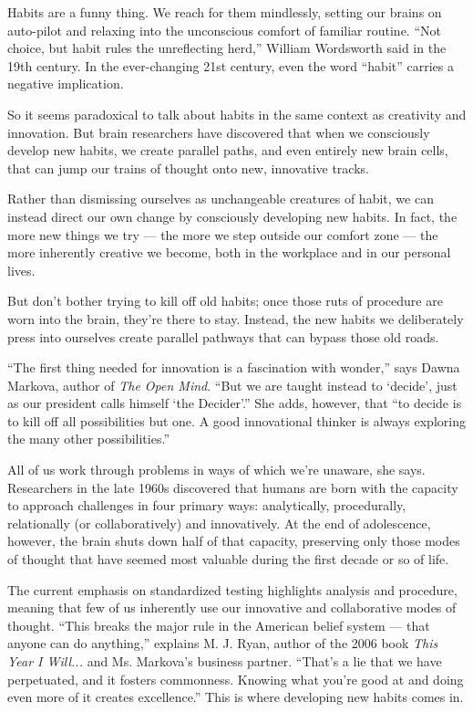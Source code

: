 \documentclass[UTF8,11pt]{ctexart}
\begin{document}
Habits are a funny thing. We reach for them mindlessly, setting our brains on auto-pilot and relaxing into the unconscious comfort of familiar routine. “Not choice, but habit rules the unreflecting herd,” William Wordsworth said in the 19th century. In the ever-changing 21st century, even the word “habit” carries a negative implication.


So it seems paradoxical to talk about habits in the same context as creativity and innovation. But brain researchers have discovered that when we consciously develop new habits, we create parallel paths, and even entirely new brain cells, that can jump our trains of thought onto new, innovative tracks.


Rather than dismissing ourselves as unchangeable creatures of habit, we can instead direct our own change by consciously developing new habits. In fact, the more new things we try — the more we step outside our comfort zone — the more inherently creative we become, both in the workplace and in our personal lives.


But don’t bother trying to kill off old habits; once those ruts of procedure are worn into the brain, they’re there to stay. Instead, the new habits we deliberately press into ourselves create parallel pathways that can bypass those old roads.


“The first thing needed for innovation is a fascination with wonder,” says Dawna Markova, author of \textit{The Open Mind}. “But we are taught instead to ‘decide’, just as our president calls himself ‘the Decider’.” She adds, however, that “to decide is to kill off all possibilities but one. A good innovational thinker is always exploring the many other possibilities.”


All of us work through problems in ways of which we’re unaware, she says. Researchers in the late 1960s discovered that humans are born with the capacity to approach challenges in four primary ways: analytically, procedurally, relationally (or collaboratively) and innovatively. At the end of adolescence, however, the brain shuts down half of that capacity, preserving only those modes of thought that have seemed most valuable during the first decade or so of life.


The current emphasis on standardized testing highlights analysis and procedure, meaning that few of us inherently use our innovative and collaborative modes of thought. “This breaks the major rule in the American belief system — that anyone can do anything,” explains M. J. Ryan, author of the 2006 book \textit{This Year I Will...} and Ms. Markova’s business partner. “That’s a lie that we have perpetuated, and it fosters commonness. Knowing what you’re good at and doing even more of it creates excellence.” This is where developing new habits comes in.
\end{document}
